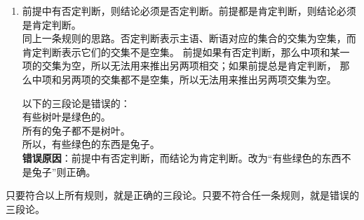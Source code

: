 \documentclass[12pt,UTF8,fontset=none]{ctexbook}
\begin{document}
\begin{enumerate}
    \item[4.] 前提中有否定判断，则结论必须是否定判断。前提都是肯定判断，则结论必须是肯定判断。\\
    同上一条规则的思路。否定判断表示主语、断语对应的集合的交集为空集，而肯定判断表示它们的交集不是空集。
    前提如果有否定判断，那么中项和某一项的交集为空，所以无法用来推出另两项相交；如果前提总是肯定判断，
    那么中项和另两项的交集都不是空集，所以无法用来推出另两项交集为空。
    \begin{ex*}
        以下的三段论是错误的： \\
        \indent 有些树叶是绿色的。\\
        \indent 所有的兔子都不是树叶。\\
        \indent 所以，有些绿色的东西是兔子。\\
        \textbf{错误原因}：前提中有否定判断，而结论为肯定判断。改为“有些绿色的东西不是兔子”则正确。
    \end{ex*}
\end{enumerate}
只要符合以上所有规则，就是正确的三段论。只要不符合任一条规则，就是错误的三段论。
\end{document}
